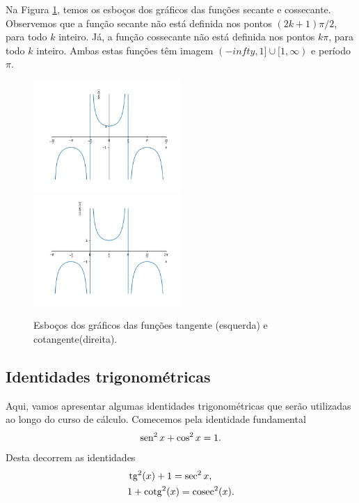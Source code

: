 Na Figura \ref{fig:co_sec_graficos}, temos os esboços dos gráficos das funções secante e cossecante. Observemos que a função secante não está definida nos pontos $(2k+1)\pi/2$, para todo $k$ inteiro. Já, a função cossecante não está definida nos pontos $k\pi$, para todo $k$ inteiro. Ambas estas funções têm imagem $(-infty, 1]\cup [1, \infty)$ e período $\pi$.

\begin{figure}[H]
  \centering
  \includegraphics[width=0.5\textwidth]{./cap_funcao/dados/fig_co_sec_graficos/fig_sec_grafico}~
  \includegraphics[width=0.5\textwidth]{./cap_funcao/dados/fig_co_sec_graficos/fig_cosec_grafico}
  \caption{Esboços dos gráficos das funções tangente (esquerda) e cotangente(direita).}
  \label{fig:co_sec_graficos}
\end{figure}

\subsection{Identidades trigonométricas}

Aqui, vamos apresentar algumas identidades trigonométricas que serão utilizadas ao longo do curso de cálculo. Comecemos pela identidade fundamental
\begin{equation}
  \operatorname{sen}^2 x + \cos^2 x = 1.
\end{equation}
Desta decorrem as identidades
\begin{align}
  &\operatorname{tg}^2(x) + 1 = \sec^2 x,\\
  &1 + \operatorname{cotg}^2(x) = \operatorname{cosec}^2(x).
\end{align}

